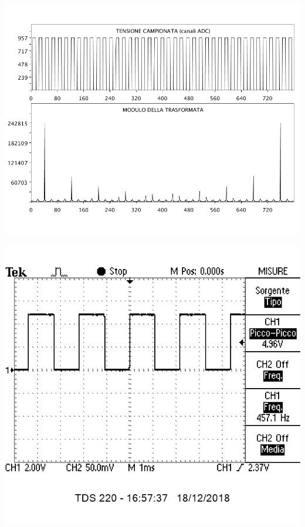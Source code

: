 \documentclass[10pt,oneside,a4paper]{article}
\newenvironment{Figure}
  {\par\medskip\noindent\minipage{\linewidth}}
  {\endminipage\par\medskip}
\begin{document}
\begin{multicols}{2}
\begin{Figure}
	\begin{center}
	\includegraphics[width=\linewidth]{quadra}
	\label{fig:quadra}
	\end{center}
\end{Figure}
\begin{Figure}
	\begin{center}
	\includegraphics[width=0.8\linewidth]{quadraosc}
	\label{fig:quadraosc}
	\end{center}
\end{Figure}

\end{multicols}
\end{document}

